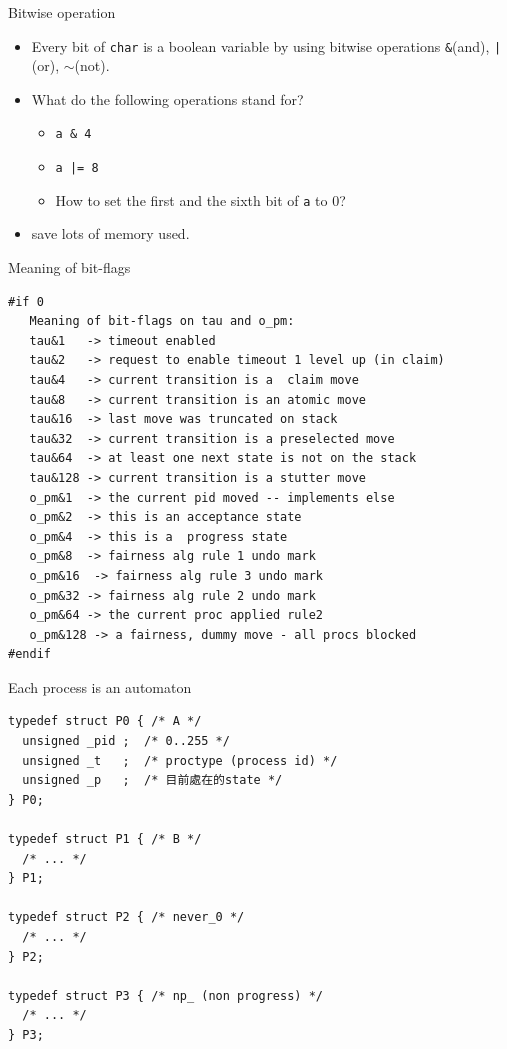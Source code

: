 \documentclass[12pt]{beamer}
\newcommand{\code}[1]{\texttt{#1}}
\begin{document}
\begin{frame}{Bitwise operation}
\begin{itemize}
	\item Every bit of \code{char} is a boolean variable by using bitwise operations \code{\&}(and), \code{|}(or), \code{$\sim$}(not).
	\item What do the following operations stand for?
	\begin{itemize}
		\item \code{a \& 4}\\	\only<2-4>{\textcolor{red}{value of the third bit is 0 or not}}
		\item \code{a |= 8}\\	\only<3-4>{\textcolor{red}{set the 4th bit to 1}}
		\item How to set the first and the sixth bit of \code{a} to 0?\\	\only<4>{\textcolor{red}{\code{a \&= $\sim$(1|32)}}}
	\end{itemize}
	\item save lots of memory used.
\end{itemize}
\end{frame}

\begin{frame}[fragile]{Meaning of bit-flags}
\begin{lstlisting}[basicstyle=\footnotesize\ttfamily]
#if 0
   Meaning of bit-flags on tau and o_pm:
   tau&1   -> timeout enabled
   tau&2   -> request to enable timeout 1 level up (in claim)
   tau&4   -> current transition is a  claim move
   tau&8   -> current transition is an atomic move
   tau&16  -> last move was truncated on stack
   tau&32  -> current transition is a preselected move
   tau&64  -> at least one next state is not on the stack
   tau&128 -> current transition is a stutter move
   o_pm&1  -> the current pid moved -- implements else
   o_pm&2  -> this is an acceptance state
   o_pm&4  -> this is a  progress state
   o_pm&8  -> fairness alg rule 1 undo mark
   o_pm&16  -> fairness alg rule 3 undo mark
   o_pm&32 -> fairness alg rule 2 undo mark
   o_pm&64 -> the current proc applied rule2
   o_pm&128 -> a fairness, dummy move - all procs blocked
#endif
\end{lstlisting}
\end{frame}

\begin{frame}[fragile]{Each process is an automaton}
\begin{lstlisting}[basicstyle=\footnotesize\ttfamily]
typedef struct P0 { /* A */
  unsigned _pid ;  /* 0..255 */
  unsigned _t   ;  /* proctype (process id) */
  unsigned _p   ;  /* 目前處在的state */
} P0;

typedef struct P1 { /* B */
  /* ... */
} P1;

typedef struct P2 { /* never_0 */
  /* ... */
} P2;

typedef struct P3 { /* np_ (non progress) */
  /* ... */
} P3;
\end{lstlisting}
\end{frame}
\end{document}
